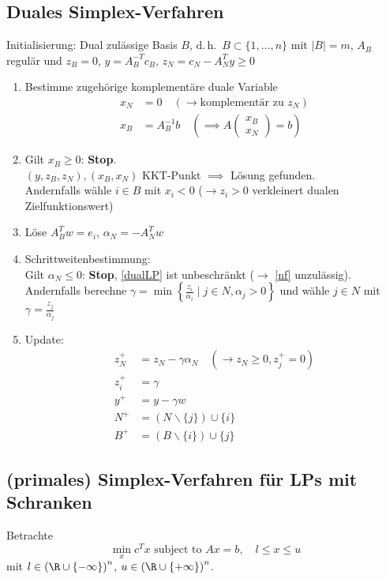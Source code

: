 \subsection{Duales Simplex-Verfahren}
Initialisierung: Dual zulässige Basis $B$, d.\,h.\ $B \subset \{1,\dots ,n \}$ mit $|B|=m$, $A_{B}$ regulär und $z_{B}=0$, $y=A_{B}^{-T}c_{B}$, $z_{N}= c_{N}-A_{N}^{T}y \geq 0$
\begin{enumerate}%
	\item Bestimme zugehörige komplementäre duale Variable
		\begin{align*}
			x_{N}&=0 \quad (\to \text{komplementär zu }z_{N})\\
      x_{B}&= A_{B}^{-1} b\quad \left( \implies A \begin{pmatrix}x_{B} \\ x_{N}\end{pmatrix} =b\right)
		\end{align*}
	\item Gilt $x_{B} \geq 0 $: \textbf{Stop}.\\
    $(y,z_{B},z_{N}),(x_{B},x_{N})$ KKT-Punkt $\implies$ Lösung gefunden.\\
		Andernfalls wähle $ i \in B$ mit $x_{i}<0$ ($\to z_{i}>0$ verkleinert dualen Zielfunktionswert)
	\item Löse $A_{B}^{T} w = e_{i}$, $\alpha_{N} = -A_{N}^{T} w$
	\item Schrittweitenbestimmung:\\
    Gilt $\alpha_{N} \leq 0 $: \textbf{Stop}, \eqref{dualLP} ist unbeschränkt ($\to$ \eqref{nf} unzulässig).\\
		Andernfalls berechne $\gamma = \min \left\{ \frac{z_{i}}{\alpha_{i}} \mid j \in N , \alpha_{j} >0 \right\}$ und wähle $j \in N$ mit $\gamma = \frac{z_{j}}{\alpha_{j}}$
	\item Update:
		\begin{align*}
			z_{N}^+ &= z_{N} - \gamma \alpha_{N} \quad (\to z_{N} \geq 0, z_{j}^+ =0)\\
			z_{i}^+ &= \gamma\\
			y^+ &= y -\gamma w\\
			N^+ &= (N \backslash \{ j \}) \cup \{ i \}\\
			B^+ &= (B \backslash \{ i \}) \cup \{ j \}
		\end{align*}
\end{enumerate}

\subsection{(primales) Simplex-Verfahren für LPs mit Schranken}
Betrachte
\begin{equation*}
	\min_{x} c^{T} x \text{ subject to } Ax = b ,\quad l \leq x \leq u
\end{equation*}
mit $l \in \left(\R \cup \{ - \infty \} \right)^n$, $u \in \left(\R \cup \{ +\infty \} \right)^n $.

